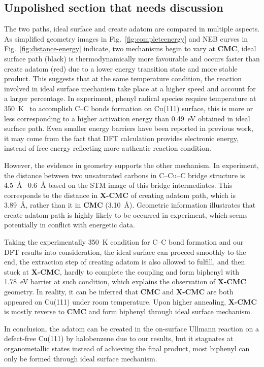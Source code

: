 \documentclass[aps,prb,amsmath,amssymb,11pt]{revtex4-1}
\newcommand{\zhzh}{\color{blue}}
\newcommand{\zhzh}{\color{blue}}
\begin{document}
\ifdefined\INTERNAL
\subsection{Unpolished section that needs discussion}

{\zhzh

The two paths, ideal surface and create adatom are compared in multiple aspects.
As simplified geometry images in Fig.~\ref{fig:completeenergy} and NEB curves in Fig.~\ref{fig:distance-energy} indicate, two mechanisms begin to vary at \textbf{CMC}, ideal surface path (black) is thermodynamically more favourable and occurs faster than create adatom (red) due to a lower energy transition state and more stable product. This suggests that at the same temperature condition, the reaction involved in ideal surface mechanism take place at a higher speed and account for a larger percentage. In experiment, phenyl radical species require temperature at \SI{350}{\kelvin}~\cite{sur_sci01}  to accomplish C--C bonds formation on Cu(111) surface, this is more or less corresponding to a higher activation energy than \SI{0.49}{\electronvolt} obtained in ideal surface path. Even smaller energy barriers have been reported in previous work\cite{pccp2010, jacs2013}, it may come from the fact that DFT calculation provides electronic energy, instead of free energy reflecting more authentic reaction condition.

However, the evidence in geometry supports the other mechanism. In experiment, the distance between two unsaturated carbons in C--Cu--C bridge structure is \SI{4.5}{\angstrom} \textpm\ \SI{0.6}{\angstrom} based on the STM image of this bridge intermediates. This corresponds to the distance in \textbf{X-CMC} of creating adatom path, which is \SI{3.89}{\angstrom}, rather than it in \textbf{CMC} (\SI{3.10}{\angstrom}). Geometric information illustrates that create adatom path is highly likely to be occurred in experiment, which seems potentially in conflict with energetic data.

Taking the experimentally \SI{350}{\kelvin} condition for C--C bond formation and our DFT results into consideration, the ideal surface can proceed smoothly to the end, the extraction step of creating adatom is also allowed to fulfill, and then stuck at \textbf{X-CMC}, hardly to complete the coupling and form biphenyl with \SI{1.78}{\electronvolt} barrier at such condition, which explains the observation of \textbf{X-CMC} geometry. In reality, it can be inferred that \textbf{CMC} and \textbf{X-CMC} are both appeared on Cu(111) under room temperature. Upon higher annealing, \textbf{X-CMC} is mostly reverse to \textbf{CMC} and form biphenyl through ideal surface mechanism. 

In conclusion, the adatom can be created in the on-surface Ullmann reaction on a defect-free Cu(111) by halobenzene due to our results, but it stagnates at organometallic states instead of achieving the final product, most biphenyl can only be formed through ideal surface mechanism.

}
\fi
\end{document}
